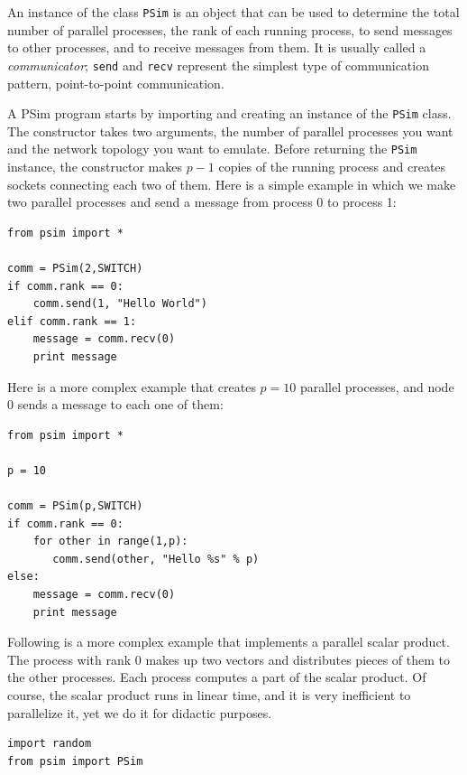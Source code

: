 \documentclass[justified,sixbynine]{tufte-book}
\def\ft{\small\tt}
\theoremstyle{plain}%
\theoremstyle{definition}
\theoremstyle{remark}
\begin{document}
\begin{fullwidth}

An instance of the class {\ft PSim} is an object that can be used to determine the total number of parallel processes, the rank of each running process, to send messages to other processes, and to receive messages from them. It is usually called a {\it communicator}; {\ft send} and {\ft recv} represent the simplest type of communication pattern, point-to-point communication.

A PSim program starts by importing and creating an instance of the {\ft PSim} class. The constructor takes two arguments, the number of parallel processes you want and the network topology you want to emulate. Before returning the {\ft PSim} instance, the constructor makes $p-1$ copies of the running process and creates sockets connecting each two of them. Here is a simple example in which we make two parallel processes and send a message from process 0 to process 1:

\begin{lstlisting}
from psim import *

comm = PSim(2,SWITCH)
if comm.rank == 0:
    comm.send(1, "Hello World")
elif comm.rank == 1:
    message = comm.recv(0)
    print message
\end{lstlisting}

Here is a more complex example that creates $p=10$ parallel processes, and node 0 sends a message to each one of them:


\begin{lstlisting}
from psim import *

p = 10

comm = PSim(p,SWITCH)
if comm.rank == 0:
    for other in range(1,p):
       comm.send(other, "Hello %s" % p)
else:
    message = comm.recv(0)
    print message
\end{lstlisting}

 Following is a more complex example that implements a parallel scalar product. The process with rank 0 makes up two vectors and distributes pieces of them to the other processes. Each process computes a part of the scalar product. Of course, the scalar product runs in linear time, and it is very inefficient to parallelize it, yet we do it for didactic purposes.


\begin{lstlisting}[caption={in file: {\ft psim\_scalar.py}}]
import random
from psim import PSim


\end{lstlisting}
\end{fullwidth}
\end{document}
